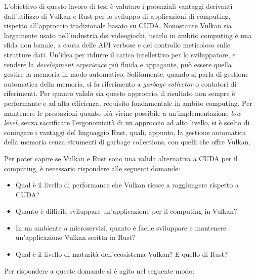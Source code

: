 L'obiettivo di questo lavoro di tesi è valutare i potenziali vantaggi derivanti dall'utilizzo di Vulkan e Rust per lo sviluppo di applicazioni di computing, rispetto all'approccio tradizionale basato su \gls{CUDA}.
Nonostante Vulkan sia largamente usato nell'industria dei videogiochi, usarlo in ambito computing è una sfida non banale, a causa delle \gls{API} verbose e del controllo meticoloso sulle strutture dati.
Un'idea per ridurre il carico intellettivo per lo sviluppatore, e rendere la \textit{development experience} più fluida e appagante, può essere quella gestire la memoria in modo automatico. Solitamente, quando si parla di gestione automatica della memoria, si fa riferimento a \textit{garbage collector} o contatori di riferimenti. Per quanto valido sia questo approccio, il risultato non sempre è performante e ad alta efficienza, requisito fondamentale in ambito computing. Per mantenere le prestazioni quanto più vicine possibile a un'implementazione \textit{low level}, senza sacrificare l'ergonomicità di un approccio ad alto livello, si è scelto di coniugare i vantaggi del linguaggio Rust, quali, appunto, la gestione automatica della memoria senza strumenti di garbage collections, con quelli che offre Vulkan.

Per poter capire se Vulkan e Rust sono una valida alternativa a \gls{CUDA} per il computing, è necessario rispondere alle seguenti domande:

\begin{itemize}
    \item Qual è il livello di performance che Vulkan riesce a raggiungere rispetto a \gls{CUDA}?
    \item Quanto è difficile sviluppare un'applicazione per il computing in Vulkan?
    \item In un ambiente a microservizi, quanto è facile sviluppare e mantenere un'applicazione Vulkan scritta in Rust?
    \item Qual è il livello di maturità dell'ecosistema Vulkan? E quello di Rust?
\end{itemize}

Per rispondere a queste domande si è agito nel seguente modo:

